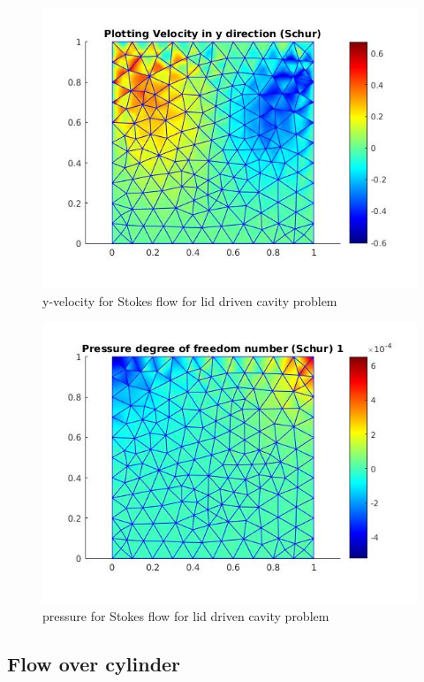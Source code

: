 \documentclass[a4paper,12pt]{book}
\begin{document}
\begin{figure}
  \includegraphics[width=\linewidth]{velocity_y_schur.jpg}
  \caption{y-velocity for Stokes flow for lid driven cavity problem}
  \label{fig:velocity_y_benchmark_stokes}
\end{figure}

\begin{figure}
  \includegraphics[width=\linewidth]{pressure.jpg}
  \caption{pressure for Stokes flow for lid driven cavity problem}
  \label{fig:pressure_benchmark_stokes}
\end{figure}

\subsection{Flow over cylinder}
\end{document}
